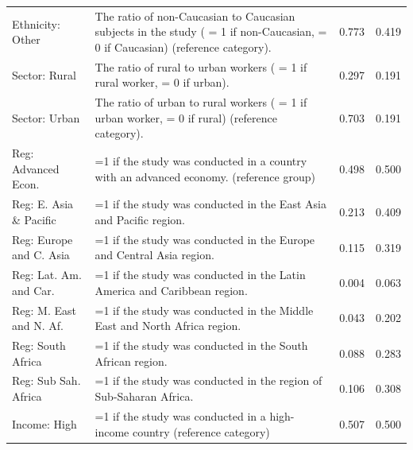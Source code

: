 \begin{singlespace}
\begin{scriptsize}
\begin{longtable}{
@{\hskip\tabcolsep\extracolsep\fill}
l
p{0.55\hsize}
cc
@{}
}
       Ethnicity: Other &                            The ratio of non-Caucasian to Caucasian subjects in the study ( = 1 if non-Caucasian, = 0 if Caucasian) (reference category). &    0.773 &  0.419 \\
          Sector: Rural &                                                                                The ratio of rural to urban workers ( = 1 if rural worker, = 0 if urban). &    0.297 &  0.191 \\
          Sector: Urban &                                                           The ratio of urban to rural workers ( = 1 if urban worker, = 0 if rural) (reference category). &    0.703 &  0.191 \\
    Reg: Advanced Econ. &                                                                      =1 if the study was conducted in a country with an advanced economy. (reference group) &    0.498 &  0.500 \\
Reg: E. Asia \& Pacific &                                                                                       =1 if the study was conducted in the East Asia and Pacific region. &    0.213 &  0.409 \\
Reg: Europe and C. Asia &                                                                                     =1 if the study was conducted in the Europe and Central Asia region. &    0.115 &  0.319 \\
 Reg: Lat. Am. and Car. &                                                                                 =1 if the study was conducted in the Latin America and Caribbean region. &    0.004 &  0.063 \\
Reg: M. East and N. Af. &                                                                                =1 if the study was conducted in the Middle East and North Africa region. &    0.043 &  0.202 \\
      Reg: South Africa &                                                                                               =1 if the study was conducted in the South African region. &    0.088 &  0.283 \\
   Reg: Sub Sah. Africa &                                                                                       =1 if the study was conducted in the region of Sub-Saharan Africa. &    0.106 &  0.308 \\
           Income: High &                                                                              =1 if the study was conducted in a high-income country (reference category) &    0.507 &  0.500 \\

\end{longtable}
\end{scriptsize}
\end{singlespace}
